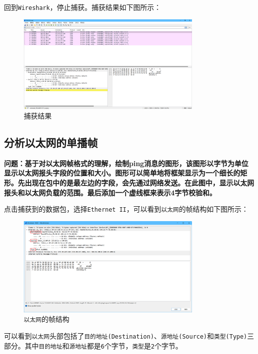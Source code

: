 \documentclass{article}
\begin{document}
回到\texttt{Wireshark}，停止捕获。捕获结果如下图所示：

\begin{figure}[H]
  \centering
  \includegraphics[width=0.8\textwidth]{images/04.png}
  \caption{捕获结果}
\end{figure}

\subsection{分析以太网的单播帧}

\textbf{问题：基于对以太网帧格式的理解，绘制ping消息的图形，该图形以字节为单位显示以太网报头字段的位置和大小。图形可以简单地将框架显示为一个细长的矩形。先出现在包中的是最左边的字段，会先通过网络发送。在此图中，显示以太网报头和以太网负载的范围。最后添加一个虚线框来表示4字节校验和。}

点击捕获到的数据包，选择\texttt{Ethernet II}，可以看到\texttt{以太网}的帧结构如下图所示：

\begin{figure}[H]
  \centering
  \includegraphics[width=0.8\textwidth]{images/05.png}
  \caption{\texttt{以太网}的帧结构}
\end{figure}

可以看到\texttt{以太网}头部包括了\texttt{目的地址(Destination)}、\texttt{源地址(Source)}和\texttt{类型(Type)}三部分。其中\texttt{目的地址}和\texttt{源地址}都是\texttt{6}个字节，\texttt{类型}是\texttt{2}个字节。
\end{document}
